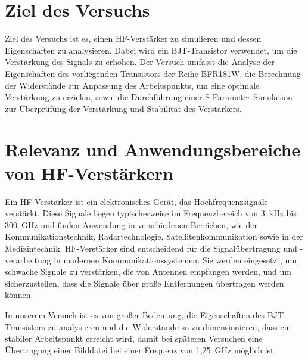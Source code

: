 \section{Ziel des Versuchs}
Ziel des Versuchs ist es, einen HF-Verstärker zu simulieren und dessen Eigenschaften zu analysieren. Dabei wird ein BJT-Transistor verwendet, um die Verstärkung des Signals zu erhöhen.
Der Versuch umfasst die Analyse der Eigenschaften des vorliegenden Transistors der Reihe BFR181W, die Berechnung der Widerstände zur Anpassung des Arbeitspunkts,
um eine optimale Verstärkung zu erzielen, sowie die Durchführung einer S-Parameter-Simulation zur Überprüfung der Verstärkung und Stabilität des Verstärkers.

\section{Relevanz und Anwendungsbereiche von HF-Verstärkern}
Ein HF-Verstärker ist ein elektronisches Gerät, das Hochfrequenzsignale verstärkt. Diese Signale liegen typischerweise im Frequenzbereich von 3~kHz bis 300~GHz und finden Anwendung in verschiedenen Bereichen, wie der Kommunikationstechnik, Radartechnologie, Satellitenkommunikation sowie in der Medizintechnik.
HF-Verstärker sind entscheidend für die Signalübertragung und -verarbeitung in modernen Kommunikationssystemen. Sie werden eingesetzt, um schwache Signale zu verstärken, die von Antennen empfangen werden, und um sicherzustellen, dass die Signale über große Entfernungen übertragen werden können.

In unserem Versuch ist es von großer Bedeutung, die Eigenschaften des BJT-Transistors zu analysieren und die Widerstände so zu dimensionieren, dass ein stabiler Arbeitspunkt erreicht wird, damit bei späteren Versuchen eine Übertragung einer Bilddatei bei einer Frequenz von 1{,}25~GHz möglich ist.
\clearpage
